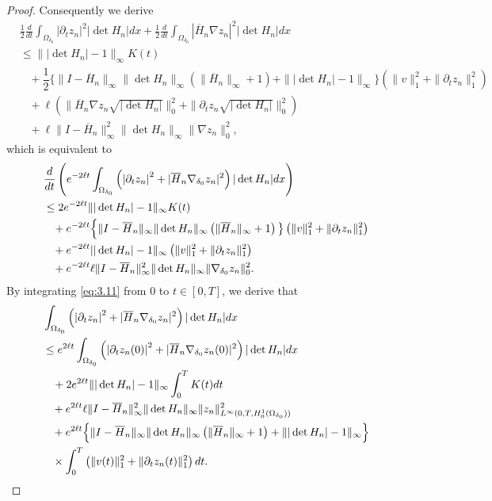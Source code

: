 \documentclass[11pt]{amsart}
\begin{document}
\begin{proof}
Consequently we derive
\begin{align*}
    &\frac{1}{2} \frac{d}{dt}\int_{\Omega_{\delta_0}}\left|\partial_t z_n\right|^2 |\det H_n| dx + \frac{1}{2} \frac{d}{dt}\int_{\Omega_{\delta_0}}|\overline{H}_n\nabla z_n|^2|\det H_n|dx \\
    &\leq \||\det H_n| -1\|_{\infty} K(t) \\
    &\;\;\;+\dfrac{1}{2}\Big\{\|I-\overline{H}_n\|_{\infty}\|\det H_n\|_{\infty}\left(\|\overline{H}_n\|_{\infty}+1\right) +\||\det H_n |-1\|_{\infty}\Big\}\left(\|v\|_1^2+\|\partial_t z_n\|_1^2\right)\\
    &\;\;\;+ \ell(\|\overline{H}_n \nabla z_n \sqrt{|\det H_n|}\|^2_0+\|\partial_t z_n \sqrt{|\det H_n|}\|^2_0)\\ 
    &\;\;\;+\ell\|I - \overline{H}_n\|^2_\infty\|\det H_n\|_{\infty}\|\nabla z_n \|_0^2, 
\end{align*}
which is equivalent to
\begin{align}\label{eq:3.11}
    &\frac{d}{dt}\left(e^{-2\ell t}\int_{\Omega_{\delta_0}}\left(\left|\partial_t z_n\right|^2 +|\overline{H}_n\nabla_{\delta_0} z_n|^2\right)|\det H_n|dx\right)\\
    &\leq 2 e^{-2\ell t} \||\det H_n| -1\|_{\infty} K(t) \notag\\
    & \;\;\;+ e^{-2\ell t} \Big\{\|I-\overline{H}_n\|_{\infty}\|\det H_n\|_{\infty}\left(\|\overline{H}_n\|_{\infty}+1\right)\big\}\left(\|v\|_1^2+\|\partial_t z_n\|_1^2\right) \notag \\
    &\;\;\; + e^{-2\ell t}||\det H_n |-1\|_{\infty}\left(\|v\|_1^2+\|\partial_t z_n\|_1^2\right)\notag\\
    &\;\;\;+ e^{-2\ell t} \ell\|I - \overline{H}_n\|^2_\infty\|\det H_n\|_{\infty}\|\nabla_{\delta_0}z_n \|_0^2\notag.
\end{align}
By integrating \eqref{eq:3.11} from $0$ to $t\in [0,T]$, we derive that
\begin{align}\label{eq:3.12}
& \int_{\Omega_{\delta_0}}\left(\left|\partial_t z_n\right|^2 +|\overline{H}_n\nabla_{\delta_0} z_n|^2\right)|\det H_n|dx\\
&\leq e^{2\ell t}\int_{\Omega_{\delta_0}}\left(\left|\partial_t z_n(0)\right|^2 +|\overline{H}_n\nabla_{\delta_0} z_n(0)|^2\right)|\det H_n|dx \notag \\
&\;\;\ + 2e^{2\ell t}\||\det H_n |-1\|_{\infty}\int_0^T K(t)dt \notag \\
& \;\;\;+ e^{2\ell t} \ell\|I - \overline{H}_n\|^2_\infty \|\det H_n\|_\infty\|z_n \|^2_{L^{\infty}(0, T, H^1_0(\Omega_{\delta_0}))}\notag\\
&\;\;\;+e^{2\ell t}\Big\{\|I-\overline{H}_n\|_{\infty}\|\det H_n\|_{\infty}\left(\|\overline{H}_n\|_{\infty}+1\right)+\||\det H_n |-1\|_{\infty}\Big\} \notag\\
&\;\;\;\times  \int_0^T\left(\|v(t)\|_1^2+\|\partial_t z_n(t)\|_1^2\right)dt\notag.
\end{align}


\end{proof}
\end{document}
